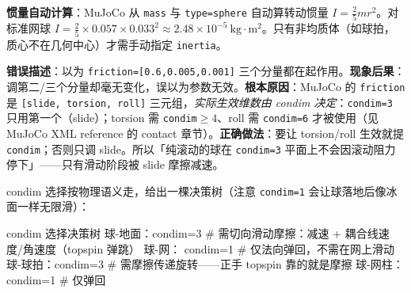 \textbf{惯量自动计算}：MuJoCo 从 \verb|mass| 与 \verb|type=sphere| 自动算转动惯量 $I=\tfrac{2}{5}mr^2$。对标准网球 $I=\tfrac{2}{5}\times0.057\times0.033^2\approx2.48\times10^{-5}\ \mathrm{kg\cdot m^2}$。只有非均质体（如球拍，质心不在几何中心）才需手动指定 \verb|inertia|。

\begin{pitfall}
\textbf{错误描述}：以为 \verb|friction=[0.6,0.005,0.001]| 三个分量都在起作用。\textbf{现象后果}：调第二/三个分量却毫无变化，误以为参数无效。\textbf{根本原因}：MuJoCo 的 \texttt{friction} 是 \texttt{[slide, torsion, roll]} 三元组，\emph{实际生效维数由 condim 决定}：\texttt{condim=3} 只用第一个（slide）；torsion 需 \texttt{condim}$\ge4$、roll 需 \texttt{condim=6} 才被使用（见 MuJoCo XML reference 的 contact 章节）。\textbf{正确做法}：要让 torsion/roll 生效就提 \verb|condim|；否则只调 slide。所以「纯滚动的球在 \verb|condim=3| 平面上不会因滚动阻力停下」——只有滑动阶段被 slide 摩擦减速。
\end{pitfall}

condim 选择按物理语义走，给出一棵决策树（注意 \verb|condim=1| 会让球落地后像冰面一样无限滑）：

\begin{codebox}[text]{condim 选择决策树}
球-地面：condim=3   # 需切向滑动摩擦：减速 + 耦合线速度/角速度（topspin 弹跳）
球-网：  condim=1   # 仅法向弹回，不需在网上滑动
球-球拍：condim=3   # 需摩擦传递旋转——正手 topspin 靠的就是摩擦
球-网柱：condim=1   # 仅弹回
\end{codebox}

